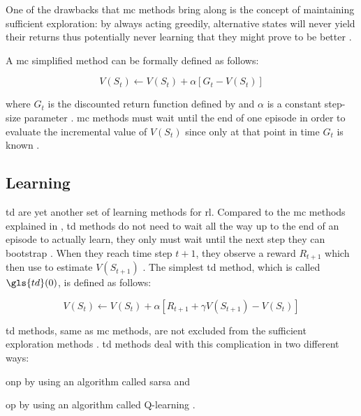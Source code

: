 \documentclass{seal_thesis}
\begin{document}
One of the drawbacks that \gls{mc} methods bring along is the concept of maintaining sufficient exploration: by always acting greedily, alternative states will never yield their returns thus potentially never learning that they might prove to be better \cite[p. 123]{Sutton2017}.

A \gls{mc} simplified method can be formally defined as follows:

\begin{equation}
\label{eq:mc_update}
	V(S_t) \leftarrow V(S_t) + \alpha [G_t - V(S_t)]
\end{equation}

where $G_t$ is the discounted return function defined by  and $\alpha$ is a constant step-size parameter \cite[p. 127]{Sutton2017}. \gls{mc} methods must wait until the end of one episode in order to evaluate the incremental value of $V(S_t)$ since only at that point in time $G_t$ is known \cite[p. 128]{Sutton2017}.

\subsection{ Learning}
\label{subsec:td_learning}

\gls{td} are yet another set of learning methods for \gls{rl}. Compared to the \gls{mc} methods explained in , \gls{td} methods do not need to wait all the way up to the end of an episode to actually learn, they only must wait until the next step \ie they can bootstrap \cite[p. 128]{Sutton2017}. When they reach time step $t+1$, they observe a reward $R_{t+1}$ which then use to estimate $V(S_{t+1})$ \cite[p. 128]{Sutton2017}. The simplest \gls{td} method, which is called $\gls{td}(0)$, is defined as follows:

\begin{equation}
\label{eq:td_update}
	V(S_t) \leftarrow V(S_t) + \alpha [R_{t+1} + \gamma V(S_{t+1}) - V(S_t)]
\end{equation}

\gls{td} methods, same as \gls{mc} methods, are not  excluded from the sufficient exploration methods \cite[p. 147]{Sutton2017}. \gls{td} methods deal with this complication in two different ways:
\begin{enumerate*}
	\item \gls{onp} by using an algorithm called \gls{sarsa} and
	\item \gls{op} by using an algorithm called Q-learning \cite[p. 128]{Sutton2017}.
\end{enumerate*}
\end{document}
